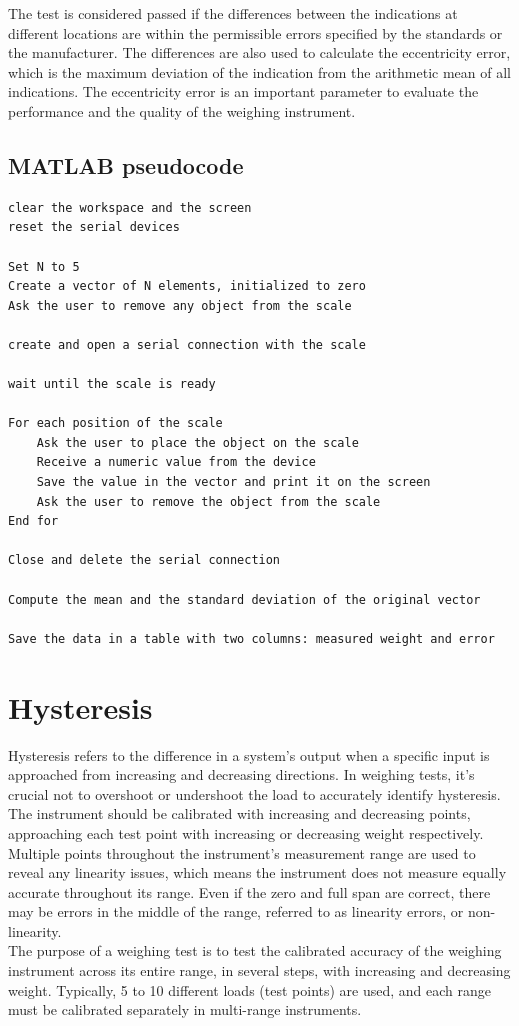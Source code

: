 \noindent The test is considered passed if the differences between the indications at different locations are within the permissible errors specified by the standards or the manufacturer. The differences are also used to calculate the eccentricity error, which is the maximum deviation of the indication from the arithmetic mean of all indications. The eccentricity error is an important parameter to evaluate the performance and the quality of the weighing instrument.


\subsection{MATLAB pseudocode}

\begin{verbatim}
clear the workspace and the screen
reset the serial devices

Set N to 5
Create a vector of N elements, initialized to zero
Ask the user to remove any object from the scale

create and open a serial connection with the scale

wait until the scale is ready

For each position of the scale
    Ask the user to place the object on the scale
    Receive a numeric value from the device
    Save the value in the vector and print it on the screen
    Ask the user to remove the object from the scale
End for

Close and delete the serial connection

Compute the mean and the standard deviation of the original vector

Save the data in a table with two columns: measured weight and error
\end{verbatim}

\section{Hysteresis}

Hysteresis refers to the difference in a system’s output when a specific input is approached from increasing and decreasing directions. In weighing tests, it’s crucial not to overshoot or undershoot the load to accurately identify hysteresis. The instrument should be calibrated with increasing and decreasing points, approaching each test point with increasing or decreasing weight respectively.
\\
Multiple points throughout the instrument’s measurement range are used to reveal any linearity issues, which means the instrument does not measure equally accurate throughout its range. Even if the zero and full span are correct, there may be errors in the middle of the range, referred to as linearity errors, or non-linearity.
\\
The purpose of a weighing test is to test the calibrated accuracy of the weighing instrument across its entire range, in several steps, with increasing and decreasing weight. Typically, 5 to 10 different loads (test points) are used, and each range must be calibrated separately in multi-range instruments.

